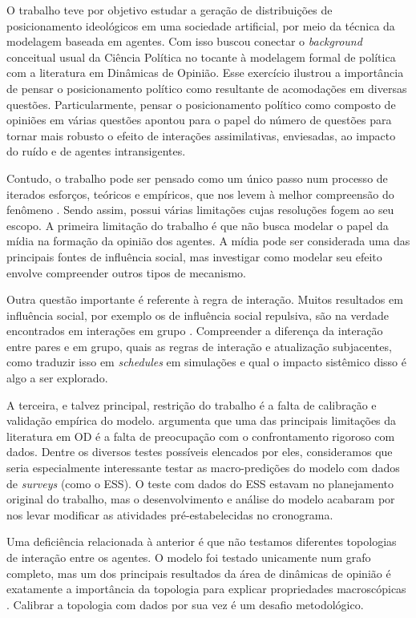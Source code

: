 O trabalho teve por objetivo estudar a geração de distribuições de
posicionamento ideológicos em uma sociedade artificial, por meio da técnica da
modelagem baseada em agentes. Com isso buscou conectar o \textit{background}
conceitual usual da Ciência Política no tocante à modelagem formal de política
com a literatura em Dinâmicas de Opinião. Esse exercício ilustrou a importância
de pensar o posicionamento político como resultante de acomodações em diversas
questões. Particularmente, pensar o posicionamento político como composto de
opiniões em várias questões apontou para o papel do número de questões para
tornar mais robusto o efeito de interações assimilativas, enviesadas, ao impacto
do ruído e de agentes intransigentes.

Contudo, o trabalho pode ser pensado como um único passo num processo de
iterados esforços, teóricos e empíricos, que nos levem à melhor compreensão do
fenômeno \cite{wilensky2015introduction}. Sendo assim, possui várias limitações
cujas resoluções fogem ao seu escopo. A primeira limitação do trabalho é que não
busca modelar o papel da mídia na formação da opinião dos agentes. A mídia pode
ser considerada uma das principais fontes de influência social, mas investigar
como modelar seu efeito envolve compreender outros tipos de mecanismo.

Outra questão importante é referente à regra de interação. Muitos resultados em
influência social, por exemplo os de influência social repulsiva, são na verdade
encontrados em interações em grupo \cite{bramson2017understanding}. Compreender
a diferença da interação entre pares e em grupo, quais as regras de interação e
atualização subjacentes, como traduzir isso em \textit{schedules} em simulações
e qual o impacto sistêmico disso é algo a ser explorado.

A terceira, e talvez principal, restrição do trabalho é a falta de calibração e
validação empírica do modelo.  argumenta que uma das
principais limitações da literatura em OD é a falta de preocupação com o
confrontamento rigoroso com dados. Dentre os diversos testes possíveis elencados
por eles, consideramos que seria especialmente interessante testar as
macro-predições do modelo com dados de \textit{surveys} (como o ESS). O teste
com dados do ESS estavam no planejamento original do trabalho, mas o
desenvolvimento e análise do modelo acabaram por nos levar modificar as
atividades pré-estabelecidas no cronograma.

Uma deficiência relacionada à anterior é que não testamos diferentes
topologias de interação entre os agentes. O modelo foi testado unicamente num
grafo completo, mas um dos principais resultados da área de dinâmicas de opinião
é exatamente a importância da topologia para explicar propriedades macroscópicas
\cite{ball2002physical}. Calibrar a topologia com dados por sua vez é um
desafio metodológico.

